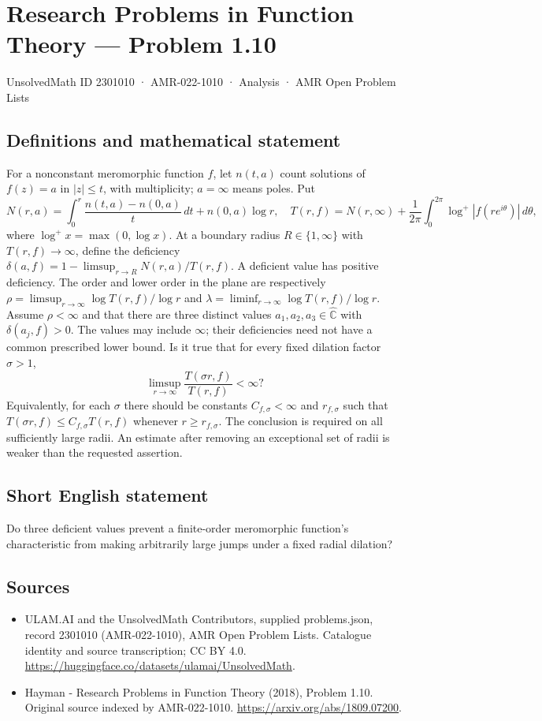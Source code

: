 \documentclass[11pt,a4paper]{article}
\begin{document}
\section*{Research Problems in Function Theory — Problem 1.10}\label{2301010}
{\small UnsolvedMath ID 2301010 · AMR-022-1010 · Analysis · AMR Open Problem Lists}
\subsection{Definitions and mathematical statement}
For a nonconstant meromorphic function $f$, let $n(t,a)$ count solutions of $f(z)=a$ in $|z|\le t$, with multiplicity; $a=\infty$ means poles. Put
\[
N(r,a)=\int_0^r\frac{n(t,a)-n(0,a)}t\,dt+n(0,a)\log r,
\quad T(r,f)=N(r,\infty)+\frac1{2\pi}\int_0^{2\pi}\log^+|f(re^{i\theta})|\,d\theta,
\]
where $\log^+x=\max(0,\log x)$. At a boundary radius $R\in\{1,\infty\}$ with $T(r,f)\to\infty$, define the deficiency
$\delta(a,f)=1-\limsup_{r\to R}N(r,a)/T(r,f)$. A deficient value has positive deficiency. The order and lower order in the plane are respectively
$\rho=\limsup_{r\to\infty}\log T(r,f)/\log r$ and
$\lambda=\liminf_{r\to\infty}\log T(r,f)/\log r$.
Assume $\rho<\infty$ and that there are three distinct values $a_1,a_2,a_3\in\widehat{\mathbb C}$ with $\delta(a_j,f)>0$. The values may include $\infty$; their deficiencies need not have a common prescribed lower bound.
Is it true that for every fixed dilation factor $\sigma>1$,
\[
\limsup_{r\to\infty}\frac{T(\sigma r,f)}{T(r,f)}<\infty?
\]
Equivalently, for each $\sigma$ there should be constants $C_{f,\sigma}<\infty$ and $r_{f,\sigma}$ such that $T(\sigma r,f)\le C_{f,\sigma}T(r,f)$ whenever $r\ge r_{f,\sigma}$. The conclusion is required on all sufficiently large radii. An estimate after removing an exceptional set of radii is weaker than the requested assertion.
\subsection{Short English statement}
Do three deficient values prevent a finite-order meromorphic function's characteristic from making arbitrarily large jumps under a fixed radial dilation?
\subsection{Sources}
\begin{itemize}
\item[S1] ULAM.AI and the UnsolvedMath Contributors, supplied problems.json, record 2301010 (AMR-022-1010), AMR Open Problem Lists. Catalogue identity and source transcription; CC BY 4.0.
\url{https://huggingface.co/datasets/ulamai/UnsolvedMath}.
\item[S2] Hayman - Research Problems in Function Theory (2018), Problem 1.10. Original source indexed by AMR-022-1010.
\url{https://arxiv.org/abs/1809.07200}.
\end{itemize}
\end{document}

